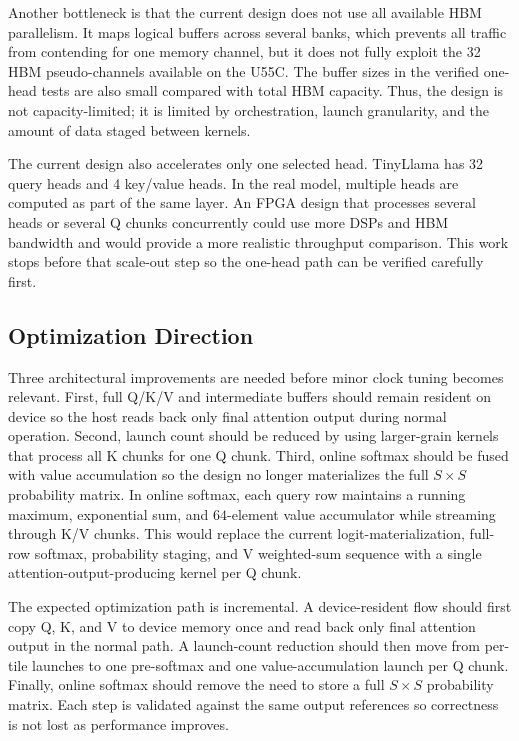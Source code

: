 \documentclass[conference]{IMSTemplate}
\begin{document}
Another bottleneck is that the current design does not use all available HBM
parallelism. It maps logical buffers across several banks, which prevents all
traffic from contending for one memory channel, but it does not fully exploit
the 32 HBM pseudo-channels available on the U55C. The buffer sizes in the
verified one-head tests are also small compared with total HBM capacity. Thus,
the design is not capacity-limited; it is limited by orchestration, launch
granularity, and the amount of data staged between kernels.

The current design also accelerates only one selected head. TinyLlama has 32
query heads and 4 key/value heads. In the real model, multiple heads are
computed as part of the same layer. An FPGA design that processes several heads
or several Q chunks concurrently could use more DSPs and HBM bandwidth and
would provide a more realistic throughput comparison. This work stops before
that scale-out step so the one-head path can be verified carefully first.

\subsection{Optimization Direction}

Three architectural improvements are needed before minor clock tuning becomes
relevant. First, full Q/K/V and intermediate
buffers should remain resident on device so the host reads back only final
attention output during normal operation. Second, launch count should be
reduced by using larger-grain kernels that process all K chunks for one Q
chunk. Third, online softmax should be fused with value accumulation so the
design no longer materializes the full \(S\times S\) probability matrix. In
online softmax, each query row maintains a running maximum, exponential sum,
and \(64\)-element value accumulator while streaming through K/V chunks. This
would replace the current logit-materialization, full-row softmax, probability
staging, and V weighted-sum sequence with a single attention-output-producing
kernel per Q chunk.

The expected optimization path is incremental. A device-resident flow should
first copy Q, K, and V to device memory once and read back only final attention
output in the normal path. A launch-count reduction should then move from
per-tile launches to one pre-softmax and one value-accumulation launch per Q
chunk. Finally, online softmax should remove the need to store a full
\(S\times S\) probability matrix. Each step is validated against the same output references so correctness is
not lost as performance improves.
\end{document}
